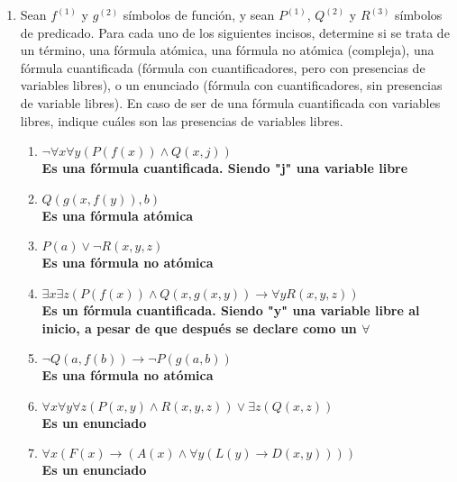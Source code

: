 \documentclass[a4paper,10pt]{article}
\begin{document}
\begin{enumerate}
  \item {} Sean $f^{(1)}$ y $g^{(2)}$ s\'imbolos de funci\'on, y sean $P^{(1)}$, $Q^{(2)}$ y $R^{(3)}$ s\'imbolos de predicado.
	Para cada uno de los siguientes incisos, determine si se trata de un t\'ermino, una f\'ormula at\'omica, una f\'ormula no at\'omica (compleja), una f\'ormula cuantificada (f\'ormula con cuantificadores, pero con presencias de variables libres), o un enunciado (f\'ormula con cuantificadores, sin presencias de variable libres). 
	En caso de ser de una f\'ormula cuantificada con variables libres, indique cu\'ales son las presencias de variables libres.

  \begin{enumerate}
  	\item $\neg\forall x\forall y(P(f(x)) \land Q(x,j))$\\
    \textbf{Es una f\'ormula cuantificada. Siendo "j" una variable libre}
  	\item $Q(g(x,f(y)), b)$\\
    \textbf{Es una f\'ormula at\'omica}
  	\item $P(a) \lor \neg R(x, y, z)$\\
    \textbf{Es una f\'ormula no at\'omica}
  	\item $\exists x \exists z(P(f(x)) \wedge Q(x,g(x, y)) \to \forall y R(x,y,z))$\\
    \textbf{Es un f\'ormula cuantificada. Siendo "y" una variable libre al inicio, a pesar de que después se declare como un $\forall$ }
  	\item $\neg Q(a, f(b)) \to \neg P(g(a, b))$\\
    \textbf{Es una f\'ormula no at\'omica}
 	  \item $\forall x \forall y \forall z(P(x,y) \wedge R(x,y,z)) \lor \exists z(Q(x,z))$\\
    \textbf{Es un enunciado}
    \item $\forall x (F(x) \to (A(x) \land \forall y (L(y) \to D(x, y))))$\\
    \textbf{Es un enunciado}


  \end{enumerate}
		
\end{enumerate}

\end{document}

